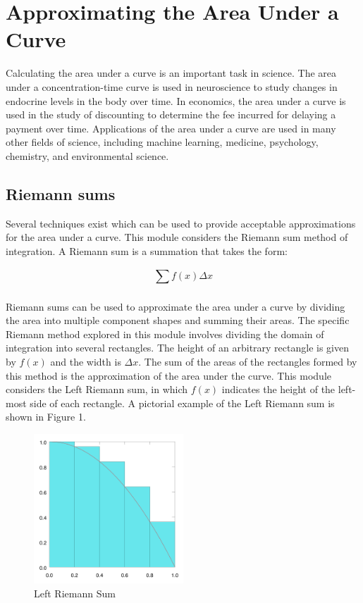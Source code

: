 \documentclass[a4paper, 11pt]{article}
\begin{document}
\section{Approximating the Area Under a Curve}

Calculating the area under a curve is an important task in science. The area under a concentration-time curve is used in neuroscience to study changes in endocrine levels in the body over time. In economics, the area under a curve is used in the study of discounting to determine the fee incurred for delaying a payment over time. Applications of the area under a curve are used in many other fields of science, including machine learning, medicine, psychology, chemistry, and environmental science.


\subsection{Riemann sums}

Several techniques exist which can be used to provide acceptable approximations for the area under a curve. This module considers the Riemann sum method of integration. A Riemann sum is a summation that takes the form:

\begin{equation}
\label{riemann}
	\sum_{}^{} f(x) \Delta x
\end{equation}

Riemann sums can be used to approximate the area under a curve by dividing the area into multiple component shapes and summing their areas. The specific Riemann method explored in this module involves dividing the domain of integration into several rectangles. The height of an arbitrary rectangle is given by $f(x)$ and the width is $\Delta x$. The sum of the areas of the rectangles formed by this method is the approximation of the area under the curve. This module considers the Left Riemann sum, in which $f(x)$ indicates the height of the left-most side of each rectangle. A pictorial example of the Left Riemann sum is shown in Figure 1.

\begin{figure}[H]
\begin{center}
\includegraphics[width=0.5\textwidth]{riemann-sum.pdf} 
\caption{Left Riemann Sum}
\end{center}
\end{figure}
\end{document}
